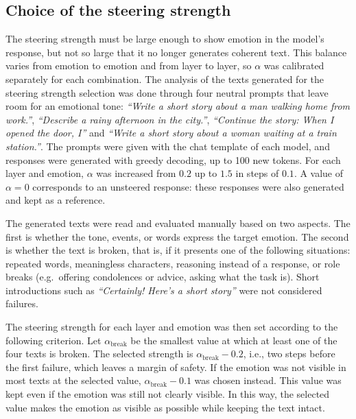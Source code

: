 \documentclass{article}
\begin{document}
\subsection{Choice of the steering strength}
\label{sec:methods_strength}
The steering strength must be large enough to show emotion in the model's response, but not so large that it no longer generates coherent text. This balance varies from emotion to emotion and from layer to layer, so $\alpha$ was calibrated separately for each combination. The analysis of the texts generated for the steering strength selection was done through four neutral prompts that leave room for an emotional tone: \textit{``Write a short story about a man walking home from work.''}, \textit{``Describe a rainy afternoon in the city.''}, \textit{``Continue the story: When I opened the door, I''} and \textit{``Write a short story about a woman waiting at a train station.''}. The prompts were given with the chat template of each model, and responses were generated with greedy decoding, up to 100 new tokens. For each layer and emotion, $\alpha$ was increased from $0.2$ up to $1.5$ in steps of $0.1$. A value of $\alpha = 0$ corresponds to an unsteered response: these responses were also generated and kept as a reference.

The generated texts were read and evaluated manually based on two aspects. The first is whether the tone, events, or words express the target emotion. The second is whether the text is broken, that is, if it presents one of the following situations: repeated words, meaningless characters, reasoning instead of a response, or role breaks (e.g.\ offering condolences or advice, asking what the task is). Short introductions such as \textit{``Certainly! Here's a short story''} were not considered failures.

The steering strength for each layer and emotion was then set according to the following criterion. Let $\alpha_{\mathrm{break}}$ be the smallest value at which at least one of the four texts is broken. The selected strength is $\alpha_{\mathrm{break}} - 0.2$, i.e., two steps before the first failure, which leaves a margin of safety. If the emotion was not visible in most texts at the selected value, $\alpha_{\mathrm{break}} - 0.1$ was chosen instead. This value was kept even if the emotion was still not clearly visible. In this way, the selected value makes the emotion as visible as possible while keeping the text intact.
\end{document}
